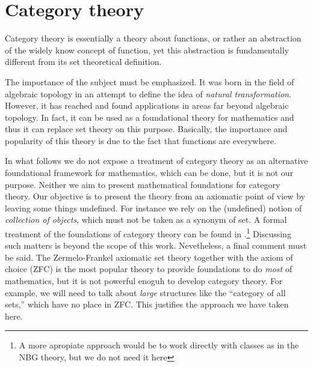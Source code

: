 \chapter{Category theory}

Category theory is essentially a theory about functions, or rather an abstraction of the widely know concept of function, yet this abstraction is fundamentally different from its  set theoretical definition. 

The importance of the subject must be emphasized. It was born in the field of algebraic topology in an attempt to define the idea of \textit{natural transformation}. However, it has reached and found applications in areas far beyond algebraic topology. In fact, it can be used as a foundational theory  for mathematics and thus it can replace set theory on this purpose. Basically, the importance and popularity of this theory is due to the fact that functions are everywhere.








In what follows we do not expose a treatment of category theory as an alternative foundational framework for mathematics, which can be done, but it is not our purpose. Neither we aim to present mathematical foundations for category theory. Our objective is to present the theory from an axiomatic point of view by leaving some things undefined. For instance we rely on the (undefined) notion of \textit{collection of objects}, which must not be taken as a synonym of set. A formal treatment of the foundations of category theory can be found in .\footnote{A more apropiate approach would be to work directly with classes as in the NBG theory, but we do not need it here}  Discussing such matters is beyond the scope of this work. Nevetheless, a final comment must be said. The Zermelo-Frankel axiomatic set theory together with the axiom of choice (ZFC) is the most popular theory to provide foundations to do \textit{most} of mathematics, but it is not powerful enoguh to develop category theory. For example, we will need to talk about \textit{large} structures like the ``category of all sets,'' which have no place in ZFC. This justifies the approach we have taken here.



